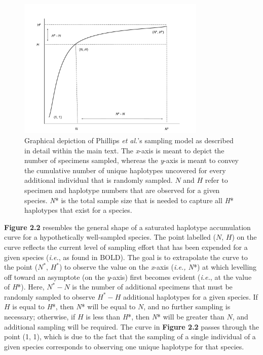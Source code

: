 \begin{figure}[H]
\centering
\includegraphics[width=0.8\textwidth]{Graph}
\caption[Visualization of Phillips \textit{et al.}'s \cite{phillips2015exploration} sampling model.]{Graphical depiction of Phillips \textit{et al.}'s \cite{phillips2015exploration} sampling model as described in detail within the main text. The \textit{x}-axis is meant to depict the number of specimens sampled, whereas the \textit{y}-axis is meant to convey the cumulative number of unique haplotypes uncovered for every additional individual that is randomly sampled. $N$ and $H$ refer to specimen and haplotype numbers that are observed for a given species. \textit{N}* is the total sample size that is needed to capture all \textit{H}* haplotypes that exist for a species.}
\end{figure}


\noindent \textbf{Figure 2.2} resembles the general shape of a saturated haplotype accumulation curve for a hypothetically well-sampled species. The point labelled ($N$, $H$) on the curve reflects the current level of sampling effort that has been expended for a given species (\textit{i.e.}, as found in BOLD). The goal is to extrapolate the curve to the point ($N^*$, $H^*$) to observe the value on the \textit{x}-axis (\textit{i.e., N}*) at which levelling off toward an asymptote (on the \textit{y}-axis) first becomes evident (\textit{i.e.}, at the value of \textit{H}*). Here, $N^*-N$ is the number of additional specimens that must be randomly sampled to observe $H^*-H$ additional haplotypes for a given species. If $H$ is equal to \textit{H}*, then \textit{N}* will be equal to $N$, and no further sampling is necessary; otherwise, if $H$ is less than \textit{H}*, then \textit{N}* will be greater than $N$, and additional sampling will be required.  The curve in \textbf{Figure 2.2} passes through the point (1, 1), which is due to the fact that the sampling of a single individual of a given species corresponds to observing one unique haplotype for that species.



